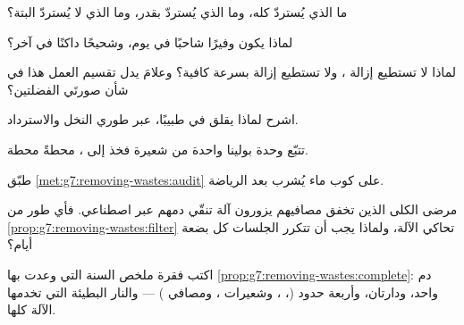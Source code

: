 \begin{exercise}[$\star$]\label{exo:g7:removing-wastes:5}
ما الذي يُستردّ كله، وما الذي يُستردّ بقدر، وما الذي لا يُستردّ
البتة؟
\end{exercise}

\begin{exercise}[$\star$]\label{exo:g7:removing-wastes:6}
لماذا يكون  وفيرًا شاحبًا في يوم، وشحيحًا داكنًا في آخر؟
\end{exercise}

\begin{exercise}[$\star\star$]\label{exo:g7:removing-wastes:7}
لماذا لا تستطيع  إزالة ، ولا تستطيع  إزالة
 بسرعة كافية؟ وعلامَ يدل تقسيم العمل هذا في شأن
صورتَي الفضلتين؟
\end{exercise}

\begin{exercise}[$\star\star$]\label{exo:g7:removing-wastes:8}
اشرح لماذا يقلق  في  طبيبًا، عبر طوري النخل
والاسترداد.
\end{exercise}

\begin{exercise}[$\star\star$]\label{exo:g7:removing-wastes:9}
تتبّع وحدة بولينا واحدة من شعيرة  فخذ إلى ، محطةً
محطة.
\end{exercise}

\begin{exercise}[$\star\star$]\label{exo:g7:removing-wastes:10}
طبّق \cref{met:g7:removing-wastes:audit} على كوب ماء يُشرب بعد
الرياضة.
\end{exercise}

\begin{exercise}[$\star\star$]\label{exo:g7:removing-wastes:11}
مرضى الكلى الذين تخفق مصافيهم يزورون آلة تنقّي دمهم عبر 
اصطناعي. فأي طور من \cref{prop:g7:removing-wastes:filter} تحاكي
الآلة، ولماذا يجب أن تتكرر الجلسات كل بضعة أيام؟
\end{exercise}

\begin{exercise}[$\star\star\star$]\label{exo:g7:removing-wastes:12}
اكتب فقرة ملخص السنة التي وعدت بها
\cref{prop:g7:removing-wastes:complete}: دم واحد، ودارتان، وأربعة
حدود (، ، وشعيرات ، ومصافي ) ---
والنار البطيئة التي تخدمها الآلة كلها.
\end{exercise}

